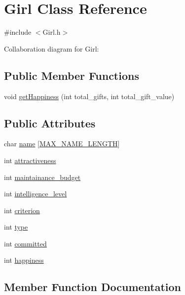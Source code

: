 \hypertarget{class_girl}{}\section{Girl Class Reference}
\label{class_girl}


{\ttfamily \#include $<$Girl.\+h$>$}



Collaboration diagram for Girl\+:
\subsection*{Public Member Functions}
\begin{DoxyCompactItemize}
\item 
void \hyperlink{class_girl_a8844d2de1392d0cdcc5e201bc319a026}{get\+Happiness} (int total\+\_\+gifts, int total\+\_\+gift\+\_\+value)
\end{DoxyCompactItemize}
\subsection*{Public Attributes}
\begin{DoxyCompactItemize}
\item 
char \hyperlink{class_girl_a2004677d7018a6564637f77e943e18ed}{name} \mbox{[}\hyperlink{_girl_8h_a0c397a708cec89c74029582574516b30}{M\+A\+X\+\_\+\+N\+A\+M\+E\+\_\+\+L\+E\+N\+G\+TH}\mbox{]}
\item 
int \hyperlink{class_girl_ab97bd68f8bc0ab5ee3fb9d2784ed1474}{attractiveness}
\item 
int \hyperlink{class_girl_a26a1e9bb93af4617482020c94fa7228c}{maintainance\+\_\+budget}
\item 
int \hyperlink{class_girl_a5c6c20728355a49c2776f291b95e8253}{intelligence\+\_\+level}
\item 
int \hyperlink{class_girl_a1a2a395adc6fdf036a4487892ea4cebb}{criterion}
\item 
int \hyperlink{class_girl_ac0242bb0ae7c23f69a75537437f76586}{type}
\item 
int \hyperlink{class_girl_ac5829e7ec762f1a3fb7484acfd6c1680}{committed}
\item 
int \hyperlink{class_girl_a50337447735a8f518fd817338d04d5b9}{happiness}
\end{DoxyCompactItemize}


\subsection{Member Function Documentation}
\mbox{\label{class_girl_a8844d2de1392d0cdcc5e201bc319a026}} 
